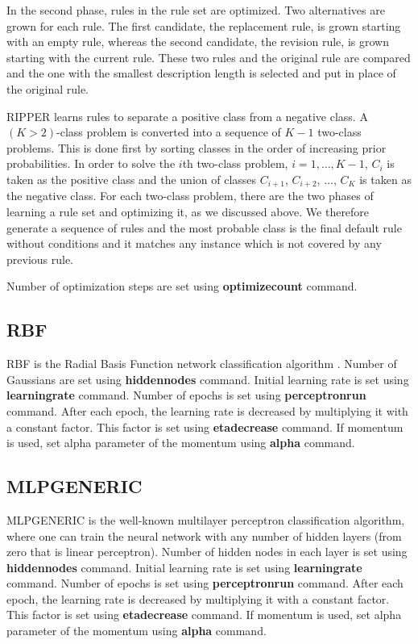 \documentclass[a4paper,12pt]{book}
\begin{document}
In the second phase, rules in the rule set are optimized. Two alternatives are grown for each rule. The first candidate, the replacement rule, is grown starting with an empty rule,  whereas the second candidate, the revision rule, is grown starting with the current rule. These two rules and the original rule are compared and the one with the smallest description length is selected and put in place of the original rule. 

RIPPER learns rules to separate a positive class from a negative class. A $(K>2)$-class problem is converted into a sequence of $K-1$ two-class problems. This is done first by sorting classes in the order of increasing prior probabilities. In order to solve the $i$th two-class problem, $i=1,\ldots,K-1$, $C_i$ is taken as the positive class and the union of classes $C_{i+1}$, $C_{i+2}$, $\ldots$, $C_K$ is taken as the negative class. For each two-class problem, there are the two phases of learning a rule set and optimizing it, as we discussed above. We therefore generate a sequence of rules and the most probable class is the final default rule without conditions and it matches any instance which is not covered by any previous rule.

Number of optimization steps are set using {\bf optimizecount} command.

\subsection{RBF}
RBF is the Radial Basis Function network classification algorithm \cite{alpaydin04}. Number of Gaussians are set using {\bf hiddennodes} command. Initial learning rate is set using {\bf learningrate} command. Number of epochs is set using {\bf perceptronrun} command. After each epoch, the learning rate is decreased by multiplying it with a constant factor. This factor is set using {\bf etadecrease} command. If momentum is used, set alpha parameter of the momentum using {\bf alpha} command.

\subsection{MLPGENERIC}
MLPGENERIC is the well-known multilayer perceptron classification algorithm, where one can train the neural network with any number of hidden layers (from zero that is linear perceptron). Number of hidden nodes in each layer is set using {\bf hiddennodes} command. Initial learning rate is set using {\bf learningrate} command. Number of epochs is set using {\bf perceptronrun} command. After each epoch, the learning rate is decreased by multiplying it with a constant factor. This factor is set using {\bf etadecrease} command. If momentum is used, set alpha parameter of the momentum using {\bf alpha} command.
\end{document}
